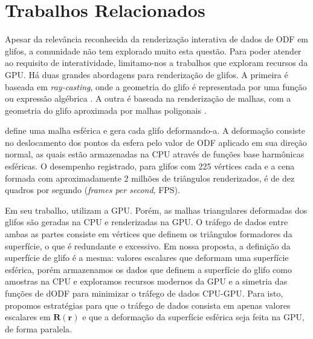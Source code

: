 \section{Trabalhos Relacionados}
\label{sec::trabalhos_relacionados}

Apesar da relevância reconhecida da renderização interativa de dados de ODF em glifos, a comunidade não tem explorado muito esta questão. Para poder atender ao requisito de interatividade, limitamo-nos a trabalhos que exploram recursos da GPU. Há duas grandes abordagens para renderização de glifos. A primeira é baseada em \textit{ray-casting}, onde a geometria do glifo é representada por uma função ou expressão algébrica \cite{peeters2009, almsick2011}. A outra é baseada na renderização de malhas, com a geometria do glifo aproximada por malhas poligonais \cite{shattuck2008}.

 define uma malha esférica e gera cada glifo deformando-a. A deformação consiste no deslocamento dos pontos da esfera pelo valor de ODF aplicado em sua direção normal, as quais estão armazenadas na CPU através de funções base harmônicas esféricas. O desempenho registrado, para glifos com 225 vértices cada e a cena formada com aproximadamente 2 milhões de triângulos renderizados, é de dez quadros por segundo (\textit{frames per second}, FPS).


Em seu trabalho,  utilizam a GPU. Porém, as malhas triangulares deformadas dos glifos são geradas na CPU e renderizadas na GPU. O tráfego de dados entre ambas as partes consiste em vértices que definem os triângulos formadores da superfície, o que é redundante e excessivo. Em nossa proposta, a definição da superfície de glifo é a mesma: valores escalares que deformam uma superfície esférica, porém armazenamos os dados que definem a superfície do glifo como amostras na CPU e exploramos recursos modernos da GPU e a simetria das funções de dODF para minimizar o tráfego de dados CPU-GPU. Para isto, propomos estratégias para que o tráfego de dados consista em apenas valores escalares em $\mathbf{R}(\mathbf{r})$ e que a deformação da superfície esférica seja feita na GPU, de forma paralela.

